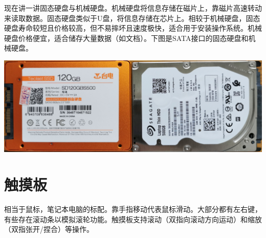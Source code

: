 现在讲一讲固态硬盘与机械硬盘。机械硬盘将信息存储在磁片上，靠磁片高速转动来读取数据。固态硬盘类似于U盘，将信息存储在芯片上。相较于机械硬盘，固态硬盘寿命较短且价格较高，但不易摔坏且速度极快，适合用于安装操作系统。机械硬盘价格便宜，适合储存大量数据（如文档）。下图是SATA接口的固态硬盘和机械硬盘。
\begin{center}
	\includegraphics[scale=0.05]{pic/HD}
\end{center} 
\section{触摸板}
相当于鼠标，笔记本电脑的标配。靠手指移动代表鼠标滑动。大部分都有左右键，有些存在滚动条以模拟滚轮功能。触摸板支持滚动（双指向滚动方向运动）和缩放（双指张开/捏合）等操作。
